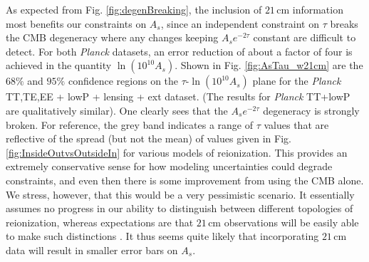 \documentclass[twocolumn,aps,prd,nofootinbib,showpacs,superscriptaddress]{revtex4-1}
\begin{document}
As expected from Fig. \ref{fig:degenBreaking}, the inclusion of $21\,\textrm{cm}$ information most benefits our constraints on $A_s$, since an independent constraint on $\tau$ breaks the CMB degeneracy where any changes keeping $A_s e^{-2\tau}$ constant are difficult to detect. For both \emph{Planck} datasets, an error reduction of about a factor of four is achieved in the quantity $\ln (10^{10} A_s)$. Shown in Fig. \ref{fig:AsTau_w21cm} are the $68\%$ and $95\%$ confidence regions on the $\tau$-$\ln (10^{10} A_s)$ plane for the \emph{Planck} TT,TE,EE + lowP + lensing + ext dataset. (The results for \emph{Planck} TT+lowP are qualitatively similar). One clearly sees that the $A_s e^{-2\tau}$ degeneracy is strongly broken. For reference, the grey band indicates a range of $\tau$ values that are reflective of the spread (but not the mean) of values given in Fig. \ref{fig:InsideOutvsOutsideIn} for various models of reionization. This provides an extremely conservative sense for how modeling uncertainties could degrade constraints, and even then there is some improvement from using the CMB alone. We stress, however, that this would be a very pessimistic scenario. It essentially assumes no progress in our ability to distinguish between different topologies of reionization, whereas expectations are that $21\,\textrm{cm}$ observations will be easily able to make such distinctions \cite{choudhury_et_al2009,watkinson_and_pritchard2014}. It thus seems quite likely that incorporating $21\,\textrm{cm}$ data will result in smaller error bars on $A_s$.
\end{document}

